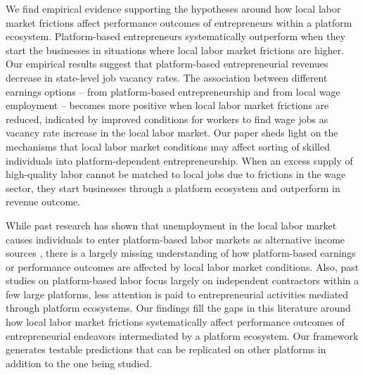 \documentclass[letterpaper,12pt]{article}
\begin{document}
We find empirical evidence supporting the hypotheses around how local labor market frictions affect performance outcomes of entrepreneurs within a platform ecosystem. Platform-based entrepreneurs systematically outperform when they start the businesses in situations where local labor market frictions are higher. Our empirical results suggest that platform-based entrepreneurial revenues decrease in state-level job vacancy rates. The association between different earnings options – from platform-based entrepreneurship and from local wage employment – becomes more positive when local labor market frictions are reduced, indicated by improved conditions for workers to find wage jobs as vacancy rate increase in the local labor market. Our paper sheds light on the mechanisms that local labor market conditions may affect sorting of skilled individuals into platform-dependent entrepreneurship. When an excess supply of high-quality labor cannot be matched to local jobs due to frictions in the wage sector, they start businesses through a platform ecosystem and outperform in revenue outcome.

While past research has shown that unemployment in the local labor market causes individuals to enter platform-based labor markets as alternative income sources \citep{burtch_can_2018,huang_unemployment_2020,jackson_availability_2022,laitenberger2023unemployment}, there is a largely missing understanding of how platform-based earnings or performance outcomes are affected by local labor market conditions. Also, past studies on platform-based labor focus largely on independent contractors within a few large platforms, less attention is paid to entrepreneurial activities mediated through platform ecosystems. Our findings fill the gaps in this literature around how local labor market frictions systematically affect performance outcomes of entrepreneurial endeavors intermediated by a platform ecosystem. Our framework generates testable predictions that can be replicated on other platforms in addition to the one being studied.
\end{document}
